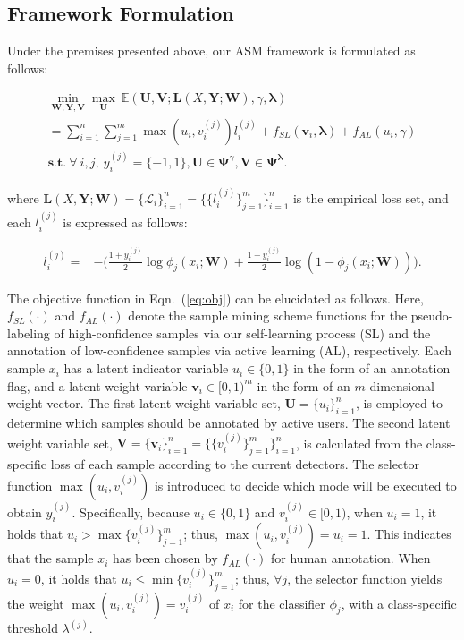 \documentclass[journal]{IEEEtran}
\begin{document}
\subsection{Framework Formulation}
Under the premises {presented} above, our {ASM} framework is formulated as follows: 
		\begin{small}\begin{equation}
		\begin{gathered}
		\underset{\mathbf{W},\mathbf{Y}, \mathbf{V}}{\min} 
			\underset{\mathbf{U}}{\max} \   
			\mathbb{E}(\mathbf{U},\mathbf{V}; \mathbf{L}(X, \mathbf{Y}; \mathbf{W}), \gamma,{\bm \lambda}) \\= \sum_{i=1}^{n}\sum_{j=1}^{m} \max(u_i, v^{(j)}_i) l^{(j)}_i +  f_{SL}(\mathbf{v}_i, {\bm \lambda}) + f_{AL}(u_i,\gamma) \\\mathbf{s.t.} \ \forall \ i,j, \  y^{(j)}_i = \{-1,1\}, \mathbf{U} \in\mathbf{\Psi}^\gamma, \mathbf{V}\in\mathbf{\Psi}^{\bm \lambda}.
		\label{eq:obj}
		\end{gathered}
		\end{equation}\end{small}{{where} $\mathbf{L}(X, \mathbf{Y}; \mathbf{W}) = \{\mathcal{L}_i\}^n_{i=1} = \{\{l^{(j)}_i\}^m_{j=1}\}_{i=1}^n$ is the empirical loss set, {and} each $l^{(j)}_i$ is expressed as follows:
\begin{small}
	\begin{equation}
	\begin{aligned}
		l^{(j)}_i = &-\big(\frac{1 + y^{(j)}_i}{2}\log\phi_j (x_i;\mathbf{W}) +\frac{1-y^{(j)}_i}{2}\log(1-\phi_j(x_i;\mathbf{W})) \big).
		\label{eq:loss}
	\end{aligned}
	\end{equation} 
\end{small}
The objective function in Eqn.~(\ref{eq:obj}) can be elucidated as follows. Here, $f_{SL}(\cdot)$ and $f_{AL}(\cdot)$ denote the sample mining scheme functions for the pseudo-labeling of high-confidence samples via {our self-learning process (SL)} and the annotation of low-confidence samples via active learning (AL), respectively. Each sample $x_i$ has a latent indicator variable $u_i \in \{0, 1\}$ in the form of an annotation flag, and a latent weight variable $\mathbf{v}_i \in [0, 1)^m$ in the form of an $m$-dimensional weight vector. {The first latent weight variable set, $\mathbf{U}=\{u_i\}_{i=1}^n$, is employed to determine which samples should be annotated by active users.} The second latent weight variable set, $\mathbf{V}=\{\mathbf{v}_i\}_{i=1}^n=\{\{v_i^{(j)}\}^m_{j=1}\}_{i=1}^n$, is calculated from the class-specific loss of each sample according to the current detectors. The selector function $\max(u_i, v^{(j)}_i)$ is introduced to decide which mode will be executed to obtain $y_i^{(j)}$. Specifically, because $u_i\in\{0,1\}$ and $v_i^{(j)}\in[0,1)$, when $u_i=1$, it holds that $u_i > \max\{v_i^{(j)}\}^m_{j=1}$; thus, $\max(u_i,v_i^{(j)}) = u_i=1$. This indicates that the sample $x_i$ has been chosen by $f_{AL}(\cdot)$ for human annotation. When $u_i=0$, it holds that $u_i \leq \min\{v_i^{(j)}\}^m_{j=1}$; thus, $\forall j$, the selector function yields the weight $ \max(u_i,v_i^{(j)}) = v_i^{(j)}$ of $x_i$ for the classifier $\phi_j$, with a class-specific threshold $\lambda^{(j)}$. 


}
\end{document}
